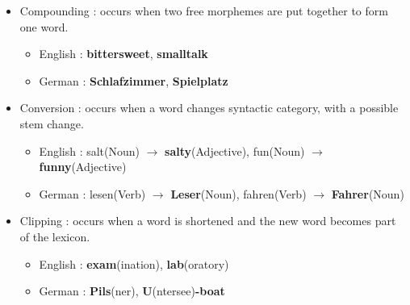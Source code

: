 \documentclass[11pt]{article}
\begin{document}
\begin{solution}
\begin{itemize}
	\item Compounding : occurs when two free morphemes are put together to form one word.
	\begin{itemize}
		\item English : \textbf{bittersweet}, \textbf{smalltalk} 
		\item German : \textbf{Schlafzimmer}, \textbf{Spielplatz}
	\end{itemize}
	\item Conversion : occurs when a word changes syntactic category, with a possible stem change.
	\begin{itemize}
		\item English : salt(Noun) $\rightarrow$ \textbf{salty}(Adjective), fun(Noun) $\rightarrow$ \textbf{funny}(Adjective)
		\item German : lesen(Verb) $\rightarrow$ \textbf{Leser}(Noun), fahren(Verb) $\rightarrow$ \textbf{Fahrer}(Noun)
	\end{itemize}
	\item Clipping : occurs when a word is shortened and the new word becomes part of the lexicon.
	\begin{itemize}
		\item English : \textbf{exam}(ination), \textbf{lab}(oratory)
		\item German : \textbf{Pils}(ner), \textbf{U}(ntersee)\textbf{-boat}
	\end{itemize}
\end{itemize}
\end{solution}

\vspace*{0.5cm}
\newpage
\end{document}

